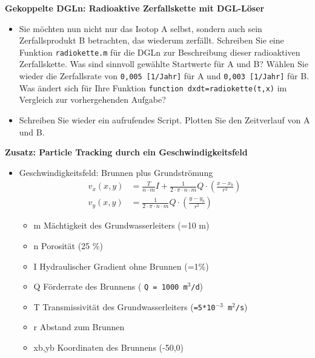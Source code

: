   \secMexercise
      \begin{frame}
          \frameMexercise
          \begin{exercise}
              \sloppy
              \textbf{Gekoppelte DGLn: Radioaktive Zerfallskette mit DGL-Löser}
              \begin{itemize}
                \item Sie möchten nun nicht nur das Isotop A selbst, sondern auch sein Zerfallsprodukt B betrachten, das wiederum zerfällt. Schreiben Sie eine Funktion \texttt{radiokette.m} für die DGLn zur Beschreibung dieser radioaktiven Zerfallskette. Was sind sinnvoll gewählte Startwerte für A und B? Wählen Sie wieder die Zerfallsrate von \texttt{0,005  [1/Jahr]} für A und \texttt{0,003  [1/Jahr]} für B. Was ändert sich für Ihre Funktion \texttt{function dxdt=radiokette(t,x)} im Vergleich zur vorhergehenden Aufgabe?
                \item Schreiben Sie wieder ein aufrufendes Script. Plotten Sie den Zeitverlauf von A und B.
              \end{itemize}
          \end{exercise}
      \end{frame}

  \secMexercise
      \begin{frame}
          \frameMexercise
          \begin{exercise}
              \sloppy
              \textbf{Zusatz: Particle Tracking durch ein Geschwindigkeitsfeld}
              \begin{itemize}
               \item Geschwindigkeitsfeld: Brunnen plus Grundströmung
                 \begin{align*}
                     v_{x}(x,y) &= \frac{T}{n \cdot m}I+\frac{1}{2 \cdot \pi \cdot n \cdot m}Q \cdot \left( \frac{x-x_{b}}{r^{2}} \right) \\
         		     v_{y}(x,y) &= \frac{1}{2 \cdot \pi \cdot n \cdot m}Q \cdot \left( \frac{y-y_{b}}{r^{2}} \right)
         		 \end{align*}

                  \begin{itemize}
					\item m	Mächtigkeit des Grundwasserleiters (=10 m)
					\item n	Porosität (25 \%)
					\item I	Hydraulischer Gradient ohne Brunnen (=1\%)
					\item Q	Förderrate des Brunnens ( \texttt{Q = 1000 m$^3$/d})
					\item T	Transmissivität des Grundwasserleiters (\texttt{=5*10$^{-3}$ m$^2$/s})
					\item r	Abstand zum Brunnen
					\item xb,yb Koordinaten des Brunnens (-50,0)
				  \end{itemize}

                \end{itemize}
          \end{exercise}
      \end{frame}

